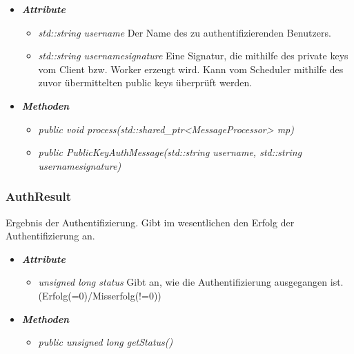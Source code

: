 \documentclass[a4paper,12pt]{article}
\begin{document}
	\begin{itemize}[label={}]

	\item\textit{\textbf{Attribute}}
		\begin{itemize}[label={\textbullet}]
			
			\item\textit{std::string username} Der Name des zu authentifizierenden Benutzers.
			\item\textit{std::string usernamesignature} Eine Signatur, die mithilfe des private keys vom Client bzw. Worker erzeugt wird. Kann vom Scheduler mithilfe des zuvor übermittelten public keys überprüft werden.
		\end{itemize}

	\item\textit{\textbf{Methoden}}
		\begin{itemize}[label={\textbullet}]
			\item\textit{public void process(std::shared\_ptr<MessageProcessor> mp)}
			\item\textit{public PublicKeyAuthMessage(std::string username, std::string usernamesignature)}
		\end{itemize}

\end{itemize}


\subsubsection{AuthResult}

Ergebnis der Authentifizierung. Gibt im wesentlichen den Erfolg der Authentifizierung an.

	\begin{itemize}[label={}]

	\item\textit{\textbf{Attribute}}
		\begin{itemize}[label={\textbullet}]
			\item\textit{unsigned long status} Gibt an, wie die Authentifizierung ausgegangen ist. (Erfolg(=0)/Misserfolg(!=0))
		\end{itemize}

	\item\textit{\textbf{Methoden}}
		\begin{itemize}[label={\textbullet}]
			\item\textit{public unsigned long getStatus()}
		\end{itemize}

\end{itemize}
\end{document}
